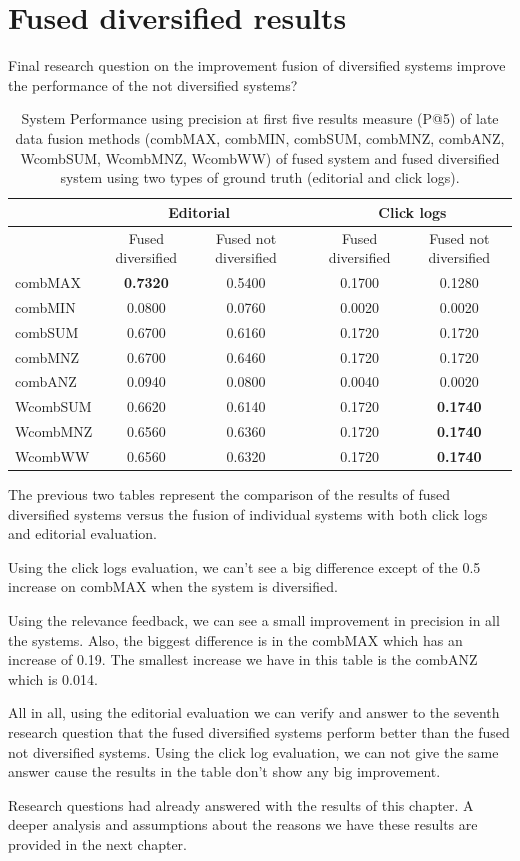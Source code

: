 \section{Fused diversified results}

Final research question on the improvement fusion of diversified systems improve the performance of the not diversified systems?

\begin{table}[H]
\begin{center}
\footnotesize
\caption{System Performance using precision at first five results measure (P@5) of late data fusion methods (combMAX, combMIN, combSUM, combMNZ, combANZ, WcombSUM, WcombMNZ, WcombWW) of fused system and fused diversified system using two types of ground truth (editorial and click logs).}
\begin{tabular}{lccccc}
\toprule
 & \multicolumn{2}{c}{Editorial} & & \multicolumn{2}{c}{Click logs} \\
\midrule
 & Fused diversified & Fused not diversified &   & Fused diversified & Fused not diversified \\
 \midrule
	combMAX & \textbf{0.7320} & 0.5400 &   & 0.1700 & 0.1280 \\
	combMIN & 0.0800 & 0.0760 &   & 0.0020 & 0.0020 \\
	combSUM & 0.6700 & 0.6160 &   & 0.1720 & 0.1720 \\
	combMNZ & 0.6700 & 0.6460 &   & 0.1720 & 0.1720 \\
	combANZ & 0.0940 & 0.0800 &   & 0.0040 & 0.0020 \\
	WcombSUM & 0.6620 & 0.6140 &   & 0.1720 & \textbf{0.1740} \\
	WcombMNZ & 0.6560 & 0.6360 &   & 0.1720 & \textbf{0.1740} \\
	WcombWW & 0.6560 & 0.6320 &   & 0.1720 & \textbf{0.1740} \\
\bottomrule
\end{tabular}
\end{center}
\end{table}

The previous two tables represent the comparison of the results of fused diversified systems versus the fusion of individual systems with both click logs and editorial evaluation.

Using the click logs evaluation, we can't see a big difference except of the 0.5 increase on combMAX when the system is diversified.

Using the relevance feedback, we can see a small improvement in precision in all the systems. Also, the biggest difference is in the combMAX which has an increase of 0.19. The smallest increase we have in this table is the combANZ which is 0.014.

All in all, using the editorial evaluation we can verify and answer to the seventh research question that the fused diversified systems perform better than the fused not diversified systems. Using the click log evaluation, we can not give the same answer cause the results in the table don't show any big improvement.


Research questions had already answered with the results of this chapter. A deeper analysis and assumptions about the reasons we have these results are provided in the next chapter.
